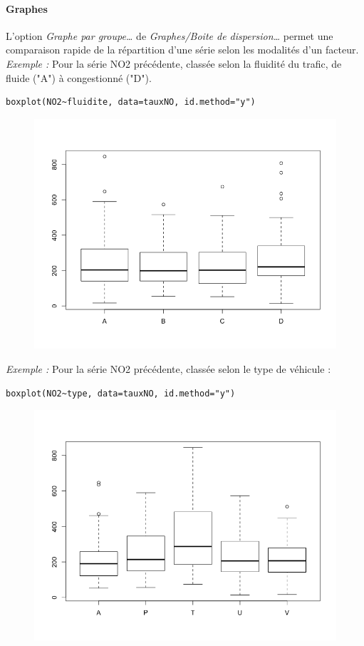 \paragraph{Graphes}
L'option \textit{Graphe par groupe\dots} de \textit{Graphes/Boite de dispersion\dots} permet une comparaison rapide de la répartition d'une série selon les modalités d'un facteur.\newline
\textit{Exemple : } Pour la série NO2 précédente, classée selon la fluidité du trafic, de fluide ("A") à congestionné ("D").
\begin{lstlisting}[language=html]
boxplot(NO2~fluidite, data=tauxNO, id.method="y")
\end{lstlisting}
\begin{figure}[H]\begin{center}\includegraphics[scale=0.4]{ilu/ccm12.png}\end{center}\end{figure}
\textit{Exemple : } Pour la série NO2 précédente, classée selon le type de véhicule :
\begin{lstlisting}[language=html]
boxplot(NO2~type, data=tauxNO, id.method="y")
\end{lstlisting}
\begin{figure}[H]\begin{center}\includegraphics[scale=0.4]{ilu/ccm13.png}\end{center}\end{figure}
